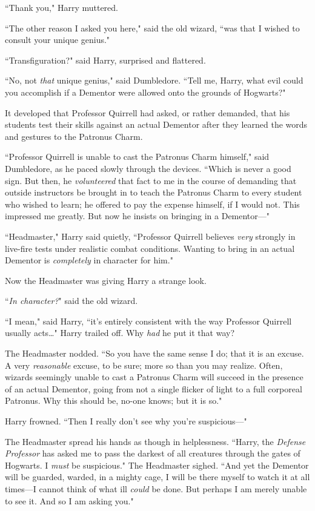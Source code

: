 ``Thank you," Harry muttered.

``The other reason I asked you here," said the old wizard, ``was that I wished to consult your unique genius."

``Transfiguration?" said Harry, surprised and flattered.

``No, not \emph{that} unique genius," said Dumbledore. ``Tell me, Harry, what evil could you accomplish if a Dementor were allowed onto the grounds of Hogwarts?"

\later

It developed that Professor Quirrell had asked, or rather demanded, that his students test their skills against an actual Dementor after they learned the words and gestures to the Patronus Charm.

``Professor Quirrell is unable to cast the Patronus Charm himself," said Dumbledore, as he paced slowly through the devices. ``Which is never a good sign. But then, he \emph{volunteered} that fact to me in the course of demanding that outside instructors be brought in to teach the Patronus Charm to every student who wished to learn; he offered to pay the expense himself, if I would not. This impressed me greatly. But now he insists on bringing in a Dementor—"

``Headmaster," Harry said quietly, ``Professor Quirrell believes \emph{very} strongly in live-fire tests under realistic combat conditions. Wanting to bring in an actual Dementor is \emph{completely} in character for him."

Now the Headmaster was giving Harry a strange look.

``\emph{In character?}" said the old wizard.

``I mean," said Harry, ``it's entirely consistent with the way Professor Quirrell usually acts{\ldots}" Harry trailed off. Why \emph{had} he put it that way?

The Headmaster nodded. ``So you have the same sense I do; that it is an excuse. A very \emph{reasonable} excuse, to be sure; more so than you may realize. Often, wizards seemingly unable to cast a Patronus Charm will succeed in the presence of an actual Dementor, going from not a single flicker of light to a full corporeal Patronus. Why this should be, no-one knows; but it is so."

Harry frowned. ``Then I really don't see why you're suspicious—"

The Headmaster spread his hands as though in helplessness. ``Harry, the \emph{Defense Professor} has asked me to pass the darkest of all creatures through the gates of Hogwarts. I \emph{must} be suspicious." The Headmaster sighed. ``And yet the Dementor will be guarded, warded, in a mighty cage, I will be there myself to watch it at all times—I cannot think of what ill \emph{could} be done. But perhaps I am merely unable to see it. And so I am asking you."


